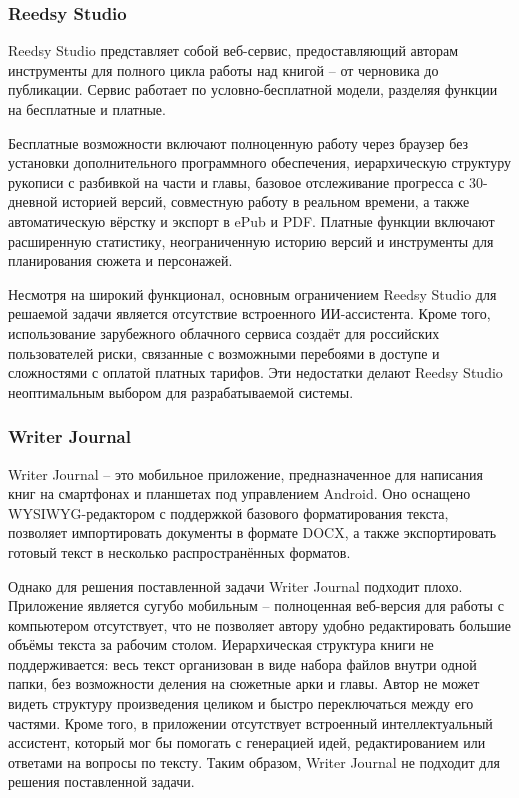\subsubsection{Reedsy Studio}

Reedsy Studio представляет собой веб-сервис, предоставляющий авторам инструменты для полного цикла работы над книгой -- от черновика до публикации. Сервис работает по условно-бесплатной модели, разделяя функции на бесплатные и платные.

Бесплатные возможности включают полноценную работу через браузер без установки дополнительного программного обеспечения, иерархическую структуру рукописи с разбивкой на части и главы, базовое отслеживание прогресса с 30-дневной историей версий, совместную работу в реальном времени, а также автоматическую вёрстку и экспорт в ePub и PDF. Платные функции включают расширенную статистику, неограниченную историю версий и инструменты для планирования сюжета и персонажей.

Несмотря на широкий функционал, основным ограничением Reedsy Studio для решаемой задачи является отсутствие встроенного ИИ-ассистента. Кроме того, использование зарубежного облачного сервиса создаёт для российских пользователей риски, связанные с возможными перебоями в доступе и сложностями с оплатой платных тарифов. Эти недостатки делают Reedsy Studio неоптимальным выбором для разрабатываемой системы.

\subsubsection{Writer Journal}

Writer Journal -- это мобильное приложение, предназначенное для написания книг на смартфонах и планшетах под управлением Android. Оно оснащено WYSIWYG-редактором с поддержкой базового форматирования текста, позволяет импортировать документы в формате DOCX, а также экспортировать готовый текст в несколько распространённых форматов.

Однако для решения поставленной задачи Writer Journal подходит плохо. Приложение является сугубо мобильным -- полноценная веб-версия для работы с компьютером отсутствует, что не позволяет автору удобно редактировать большие объёмы текста за рабочим столом. Иерархическая структура книги не поддерживается: весь текст организован в виде набора файлов внутри одной папки, без возможности деления на сюжетные арки и главы. Автор не может видеть структуру произведения целиком и быстро переключаться между его частями. Кроме того, в приложении отсутствует встроенный интеллектуальный ассистент, который мог бы помогать с генерацией идей, редактированием или ответами на вопросы по тексту. Таким образом, Writer Journal не подходит для решения поставленной задачи.

